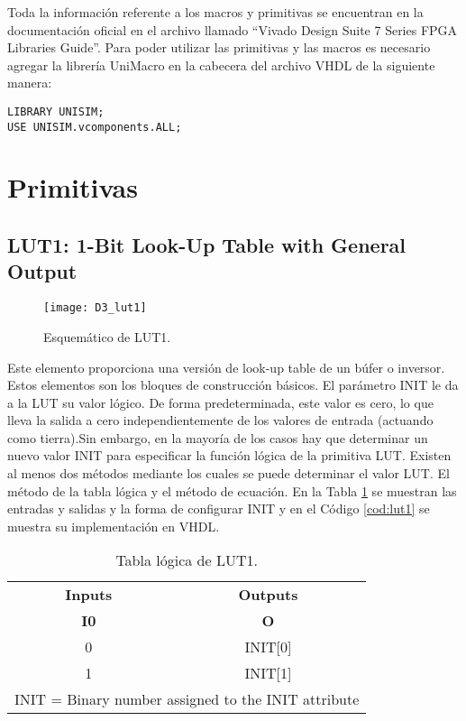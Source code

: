 	Toda la información referente a los macros y primitivas se encuentran en la documentación oficial en el archivo llamado ``Vivado Design Suite 7 Series FPGA Libraries Guide''. Para poder utilizar las primitivas y las macros es necesario agregar la librería UniMacro en la cabecera del archivo VHDL de la siguiente manera: 

\vspace{0.4cm}
\begin{lstlisting}[style = VHDL_TEXT]
LIBRARY UNISIM;
USE UNISIM.vcomponents.ALL;
\end{lstlisting}

	\section{Primitivas}
	
		\subsection{LUT1: 1-Bit Look-Up Table with General Output}
	
	\begin{figure}[hbtp]
		\caption{Esquemático de LUT1.}
		\centering
		\texttt{[image: D3\_lut1]}
		\label{fig:D2_lut1}
	\end{figure}	
	
Este elemento proporciona una versión de look-up table de un búfer o inversor. Estos elementos son los bloques de construcción básicos. El parámetro INIT le da a la LUT su valor lógico. De forma predeterminada, este valor es cero, lo que lleva la salida a cero independientemente de los valores de entrada (actuando como tierra).Sin embargo, en la mayoría de los casos hay que determinar un nuevo valor INIT para especificar la función lógica de la primitiva LUT. Existen al menos dos métodos mediante los cuales se puede determinar el valor LUT. El método de la tabla lógica y el método de ecuación. En la Tabla \ref{tab:lut1} se muestran las entradas y salidas y la forma de configurar INIT y en el Código \ref{cod:lut1} se muestra su implementación en VHDL.


	\begin{table}[htbp]
		\centering
		\caption{Tabla lógica de LUT1.}
		\begin{tabular}{|cc|}
		\hline
		\multicolumn{1}{|c|}{\textbf{Inputs}} & \textbf{Outputs} \\ 
		\multicolumn{1}{|c|}{\textbf{I0}} & \textbf{O} \\ \hline 
		\multicolumn{1}{|c|}{0} & INIT[0] \\ \hline
		\multicolumn{1}{|c|}{1} & INIT[1] \\ \hline
		\multicolumn{2}{|c|}{INIT = Binary number assigned to the INIT attribute}          \\ \hline
		\end{tabular}
		\label{tab:lut1}
	\end{table}	
	

